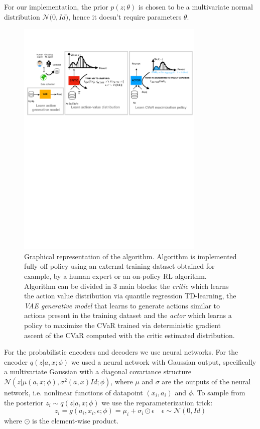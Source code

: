 For our implementation, the prior $p(z; \theta)$ is chosen to be a multivariate normal
distribution $\mathcal{N}\big( 0,Id\big )$, hence it doesn't require parameters $\theta$.
\begin{figure}[ht]
    \centering
    \includegraphics[width=0.8\textwidth]{images/diagram.pdf}
    \caption{Graphical representation of the algorithm.
    Algorithm is implemented fully off-policy using an external training dataset obtained
    for example, by a human expert or an on-policy RL algorithm.
    Algorithm can be divided in 3 main blocks: the \textit{critic} which learns 
    the action value distribution via quantile regression TD-learning, the \textit{VAE generative model}
    that learns to generate actions similar to actions present in the training dataset and
    the \textit{actor} which learns a policy to maximize the CVaR trained
    via deterministic gradient ascent of the CVaR computed with the critic estimated distribution. }
    \label{fig:diagram}

\end{figure}
For the probabilistic encoders and decoders we use neural networks.
For the encoder $q(z|a,x;\phi)$ we used a neural network with  Gaussian output, specifically a 
multivariate Gaussian with a diagonal covariance structure $\mathcal{N}(z | \mu(a,x;\phi), \sigma^2(a,x)Id ; \phi)$,
where $\mu$ and $\sigma$ are the outputs of the neural network, i.e. nonlinear 
functions of datapoint $(x_i,a_i)$ and $\phi$.
To sample from the posterior $z_i \sim q(z|a,x; \phi)$ we use the reparameterization trick:
\begin{equation}
    z_i = g(a_i,x_i, \epsilon; \phi)=\mu_i + \sigma_i \odot \epsilon \quad \epsilon \sim  \mathcal{N}(0,Id)
\end{equation}
where $\odot$ is the element-wise product.

